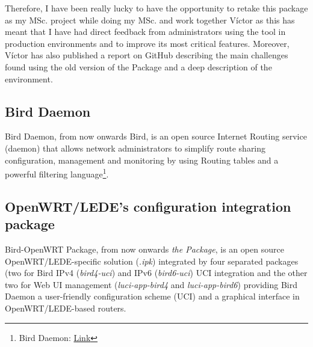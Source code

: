 Therefore, I have been really lucky to have the opportunity to retake this package as my MSc. project while doing my MSc. and work together Víctor as this has meant that I have had direct feedback from administrators using the tool in production environments and to improve its most critical features. Moreover, Víctor has also published a report on GitHub \cite{bgpbmx6} describing the main challenges found using the old version of the Package and a deep description of the environment.

\subsection{Bird Daemon}
Bird Daemon, from now onwards Bird, is an open source Internet Routing service (daemon) that allows network administrators to simplify route sharing configuration, management and monitoring by using Routing tables and a powerful filtering language\footnote{Bird Daemon: \href{http://bird.network.cz/}{Link}}.

\subsection{OpenWRT/LEDE's configuration integration package}
Bird-OpenWRT Package, from now onwards \textit{the Package}, is an open source OpenWRT/LEDE-specific solution (\textit{.ipk}) integrated by four separated packages (two for Bird IPv4 (\textit{bird4-uci}) and IPv6 (\textit{bird6-uci}) UCI integration and the other two for Web UI management (\textit{luci-app-bird4} and \textit{luci-app-bird6}) providing Bird Daemon a user-friendly configuration scheme (UCI) and a graphical interface in OpenWRT/LEDE-based routers.

